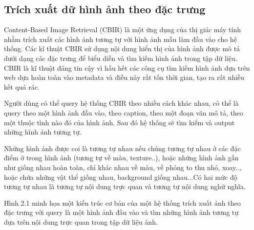 \documentclass[a4paper,14pt]{extreport}
\begin{document}
\subsection{ Trích xuất dữ hình ảnh theo đặc trưng } 
Content-Based Image Retrieval (CBIR) là một ứng dụng của thị giác máy tính nhằm trích xuất các hình ảnh tương tự với hình ảnh mẫu làm đầu vào cho hệ thống. Các kĩ thuật CBIR sử dụng nội dung hiển thị của hình ảnh được mô tả dưới dạng các đặc trưng để biểu diễn và tìm kiếm hình ảnh trong tập dữ liệu. CBIR là kĩ thuật đáng tin cậy vì hầu hết các công cụ tìm kiếm hình ảnh dựa trên web dựa hoàn toàn vào metadata và điều này rất tốn thời gian, tạo ra rất nhiều kết quả rác. 

Người dùng có thể query hệ thống CBIR theo nhiều cách khác nhau, có thể là query theo một hình ảnh đầu vào, theo caption, theo một đoạn văn mô tả, theo một thuộc tình nào đó của hình ảnh. Sau đó hệ thống sẽ tìm kiếm và output những hình ảnh tương tự.

Những hình ảnh được coi là tương tự nhau nếu chúng tương tự nhau ở các đặc điểm ở trong hình ảnh (tương tự về màu, texture..), hoặc những hình ảnh gần như giống nhau hoàn toàn, chỉ khác nhau về màu, về phóng to thu nhỏ, xoay.., hoặc chứa những vật thể giống nhau, background giống nhau...Có hai mức độ tương tự nhau là tương tự nội dung trực quan và tương tự nội dung nghữ nghĩa.

Hình 2.1 minh họa một kiến trúc cơ bản của một hệ thống trích xuất ảnh theo đặc trưng với query là một hình ảnh đầu vào và tìm những hình ảnh tương tự dựa trên nội dung trực quan trong tập dữ liệu ảnh.
\end{document}
